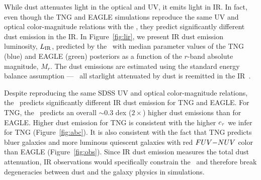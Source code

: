 While dust attenuates light in the optical and UV, it emits light in
IR. In fact, even though the TNG and EAGLE simulations reproduce the same UV and
optical color-magnitude relations with the \eda, they predict significantly 
different dust emission in the IR. In Figure~\ref{fig:lir}, we present IR dust
emission luminosity, $L_{\rm IR}$, predicted by the \eda~with median parameter values of 
the TNG (blue) and EAGLE (green) posteriors as a function of the $r$-band 
absolute magnitude, $M_r$. The dust emissions are estimated using the standard
energy balance assumption --- \ie~all starlight attenuated by dust is reemitted 
in the IR~\citep{dacunha2008}. 

Despite reproducing the same SDSS UV and optical color-magnitude relations, the
\eda~predicts significantly different IR dust emission for TNG and EAGLE. For
TNG, the \eda~predicts an overall ${\sim}0.3$ dex ($2\times$) higher dust
emissions than for EAGLE. Higher dust emission for TNG
is consistent with the higher $c_\tau$ we infer for TNG (Figure~\ref{fig:abc}).
It is also consistent with the fact that TNG predicts bluer galaxies and more
luminous quiescent galaxies with red $FUV{-}NUV$ color than EAGLE
(Figure~\ref{fig:obs}). Since IR dust emission measures the total dust
attenuation, IR observations would specifically constrain the \eda~and
therefore break degeneracies between dust and the galaxy physics in simulations.


